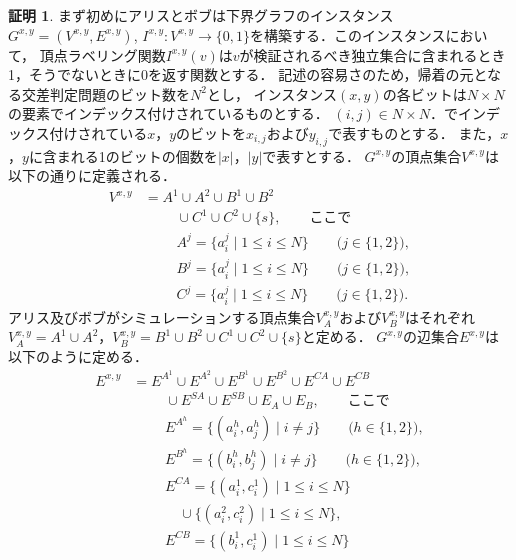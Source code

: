 \documentclass[11pt,a4paper]{jarticle}
\theoremstyle{definition}
\newtheorem*{prf*}{証明}
\begin{document}
\begin{prf*}
まず初めにアリスとボブは下界グラフのインスタンス$G^{x,y} = (V^{x,y}, E^{x,y})$, 
$I^{x,y} : V^{x,y} \to \{0, 1\}$を構築する．このインスタンスにおいて，
頂点ラベリング関数$I^{x,y}(v)$は$v$が検証されるべき独立集合に含まれるとき1，そうでないときに0を返す関数とする．
記述の容易さのため，帰着の元となる交差判定問題のビット数を$N^2$とし，
インスタンス$(x, y)$の各ビットは$N\times N$の要素でインデックス付けされているものとする．
$(i, j) \in N \times N$．でインデックス付けされている$x$，$y$のビットを$x_{i,j}$および$y_{i,j}$で表すものとする．
また，$x$，$y$に含まれる1のビットの個数を$|x|$，$|y|$で表すとする．
$G^{x,y}$の頂点集合$V^{x,y}$は以下の通りに定義される．
\begin{align*}
V^{x,y} &= A^{1} \cup A^{2} \cup B^{1} \cup B^{2} \\
&\phantom{=} \quad \cup C^{1} \cup C^{2} \cup \{s\}, \quad \quad \text{ここで}\\
&\phantom{=} \quad A^{j} = \{a^{j}_{i} \mid 1\leq i \leq N\} \quad \quad \text{($j \in \{1, 2\}$)}, \\
&\phantom{=} \quad B^{j} = \{a^{j}_{i} \mid 1\leq i \leq N\} \quad \quad \text{($j \in \{1, 2\}$)}, \\
&\phantom{=} \quad C^{j} = \{a^{j}_{i} \mid 1\leq i \leq N\} \quad \quad \text{($j \in \{1, 2\}$)}.
\end{align*}
アリス及びボブがシミュレーションする頂点集合$V^{x,y}_{A}$および$V^{x,y}_{B}$はそれぞれ
$V^{x,y}_{A} = A^{1} \cup A^{2}$，$V^{x,y}_{B} = B^{1} \cup B^{2} \cup C^{1} \cup C^{2} \cup \{s\}$と定める．
$G^{x,y}$の辺集合$E^{x,y}$は以下のように定める．
\begin{align*}
E^{x,y} &= E^{A^{1}} \cup E^{A^{2}} \cup E^{B^{1}} \cup E^{B^{2}} \cup E^{CA} \cup E^{CB} \\
&\phantom{=} \quad \cup E^{SA} \cup E^{SB} \cup E_{A} \cup E_{B}, \quad \quad \text{ここで}\\
&\phantom{=} \quad E^{A^{h}} = \{(a^{h}_{i}, a^{h}_{j})  \mid i \neq j\} \quad \quad \text{($h \in \{1, 2\}$)}, \\
&\phantom{=} \quad E^{B^{h}} = \{(b^{h}_{i}, b^{h}_{j})  \mid i \neq j\} \quad \quad \text{($h \in \{1, 2\}$)}, \\
&\phantom{=} \quad E^{CA} = \{(a^{1}_{i}, c^{1}_{i}) \mid 1\leq i \leq N\} \\
&\phantom{=} \quad \quad \cup \{(a^{2}_{i}, c^{2}_{i}) \mid 1\leq i \leq N\}, \\
&\phantom{=} \quad E^{CB} = \{(b^{1}_{i}, c^{1}_{i}) \mid 1\leq i \leq N\} \\

\end{align*}
\end{prf*}
\end{document}
